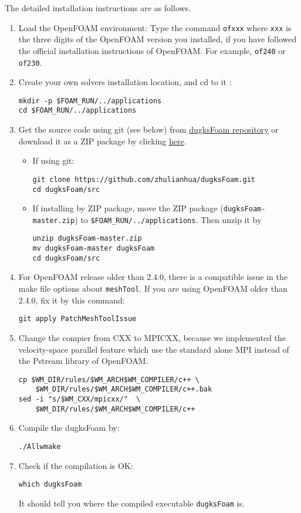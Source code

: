 The detailed installation instructions are as follows.
\begin{enumerate}
\item Load the OpenFOAM environment:
Type the command \texttt{ofxxx} where \texttt{xxx} is the three digits of the OpenFOAM version you installed,
if you have followed the official installation instructions of OpenFOAM. For example, \texttt{of240} or \texttt{of230}.
\item Create your own solvers installation location, and cd to it :
\begin{verbatim}
mkdir -p $FOAM_RUN/../applications
cd $FOAM_RUN/../applications
\end{verbatim}
\item Get the source code using git (see below) from \href{https://github.com/zhulianhua/dugksFoam}{dugksFoam repository}
or download it as a ZIP package by clicking \href{https://github.com/zhulianhua/dugksFoam/archive/master.zip}{here}.
\begin{itemize}
\item If using git:
\begin{verbatim}
git clone https://github.com/zhulianhua/dugksFoam.git
cd dugksFoam/src
\end{verbatim}
\item If installing by ZIP package, move the ZIP package (\texttt{dugksFoam-master.zip}) to \verb|$FOAM_RUN/../applications|. Then unzip it by
\begin{verbatim}
unzip dugksFoam-master.zip
mv dugksFoam-master dugksFoam
cd dugksFoam/src
\end{verbatim}
\end{itemize}

\item For OpenFOAM release older than 2.4.0, there is a compatible issue in the make file options about \verb|meshTool|.
If you are using OpenFOAM older than 2.4.0, fix it by this command:
\begin{verbatim}
git apply PatchMeshToolIssue
\end{verbatim}

\item Change the compier from CXX to MPICXX, because we implemented the velocity-space parallel feature which use the standard alone MPI instead of the Pstream library of OpenFOAM.
\begin{verbatim}cp $WM_DIR/rules/$WM_ARCH$WM_COMPILER/c++ \
    $WM_DIR/rules/$WM_ARCH$WM_COMPILER/c++.bak
sed -i "s/$WM_CXX/mpicxx/"  \
    $WM_DIR/rules/$WM_ARCH$WM_COMPILER/c++ 
\end{verbatim}

\item Compile the dugksFoam by:
\begin{verbatim}
./Allwmake
\end{verbatim}

\item Check if the compilation is OK:
\begin{verbatim}
which dugksFoam
\end{verbatim}
It should tell you where the compiled executable \verb|dugksFoam| is.
\end{enumerate}
%


